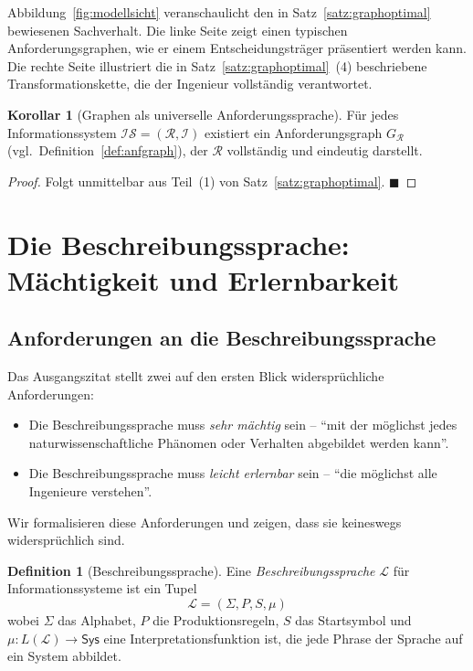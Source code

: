 ﻿\documentclass[a4paper,12pt]{article}
\theoremstyle{definition}
\newtheorem{definition}{Definition}
\newtheorem{korollar}{Korollar}
\begin{document}
Abbildung~\ref{fig:modellsicht} veranschaulicht den in Satz~\ref{satz:graphoptimal}
bewiesenen Sachverhalt. Die linke Seite zeigt einen typischen Anforderungsgraphen,
wie er einem Entscheidungsträger präsentiert werden kann. Die rechte Seite
illustriert die in Satz~\ref{satz:graphoptimal}~(4) beschriebene Transformationskette,
die der Ingenieur vollständig verantwortet.

\begin{korollar}[Graphen als universelle Anforderungssprache]
\label{kor:graphuniv}
Für jedes Informationssystem $\mathcal{IS} = (\mathcal{R}, \mathcal{I})$ existiert ein
Anforderungsgraph $G_\mathcal{R}$ (vgl.\ Definition~\ref{def:anfgraph}), der
$\mathcal{R}$ vollständig und eindeutig darstellt.
\end{korollar}

\begin{proof}
Folgt unmittelbar aus Teil~(1) von Satz~\ref{satz:graphoptimal}. $\blacksquare$
\end{proof}

\section{Die Beschreibungssprache: Mächtigkeit und Erlernbarkeit}
\label{sec:beschreibungssprache}

\subsection{Anforderungen an die Beschreibungssprache}

Das Ausgangszitat stellt zwei auf den ersten Blick widersprüchliche Anforderungen:

\begin{itemize}
  \item Die Beschreibungssprache muss \emph{sehr mächtig} sein -- \enquote{mit der möglichst
        jedes naturwissenschaftliche Phänomen oder Verhalten abgebildet werden kann}.
  \item Die Beschreibungssprache muss \emph{leicht erlernbar} sein -- \enquote{die möglichst
        alle Ingenieure verstehen}.
\end{itemize}

Wir formalisieren diese Anforderungen und zeigen, dass sie keineswegs widersprüchlich sind.

\begin{definition}[Beschreibungssprache]
\label{def:beschrsprache}
Eine \emph{Beschreibungssprache} $\mathcal{L}$ für Informationssysteme ist ein Tupel
\[
  \mathcal{L} = (\Sigma, P, S, \mu)
\]
wobei $\Sigma$ das Alphabet, $P$ die Produktionsregeln, $S$ das Startsymbol und
$\mu: L(\mathcal{L}) \to \mathsf{Sys}$ eine Interpretationsfunktion ist, die jede
Phrase der Sprache auf ein System abbildet.
\end{definition}
\end{document}
